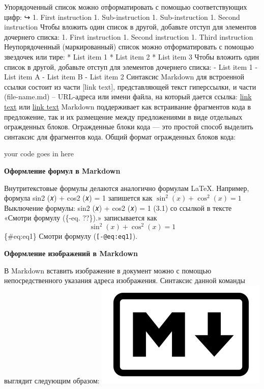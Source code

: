 \documentclass[
  english,
  russian,
  12pt,
  a4paper,
  DIV=11,
  numbers=noendperiod]{scrreprt}
\newenvironment{Shaded}{\begin{snugshade}}{\end{snugshade}}
\newcommand{\NormalTok}[1]{\textcolor[rgb]{0.00,0.23,0.31}{#1}}
\begin{document}
Упорядоченный список можно отформатировать с помощью соответствующих
цифр: ↪ 1. First instruction 1. Sub-instruction 1. Sub-instruction 1.
Second instruction Чтобы вложить один список в другой, добавьте отступ
для элементов дочернего списка: 1. First instruction 1. Second
instruction 1. Third instruction Неупорядоченный (маркированный) список
можно отформатировать с помощью звездочек или тире: * List item 1 * List
item 2 * List item 3 Чтобы вложить один список в другой, добавьте отступ
для элементов дочернего списка: - List item 1 - List item A - List item
B - List item 2 Синтаксис Markdown для встроенной ссылки состоит из
части {[}link text{]}, представляющей текст гиперссылки, и части
(file-name.md) -- URL-адреса или имени файла, на который дается ссылка:
\href{file-name.md}{link text} или \href{http://example.com/}{link text}
Markdown поддерживает как встраивание фрагментов кода в предложение, так
и их размещение между предложениями в виде отдельных огражденных блоков.
Огражденные блоки кода --- это простой способ выделить синтаксис для
фрагментов кода. Общий формат огражденных блоков кода:

\begin{Shaded}
\begin{Highlighting}[]
\NormalTok{your code goes in here}
\end{Highlighting}
\end{Shaded}

\textbf{Оформление формул в Markdown}

Внутритекстовые формулы делаются аналогично формулам LaTeX. Например,
формула sin2 (𝑥) + cos2 (𝑥) = 1 запишется как
\(\sin^2 (x) + \cos^2 (x) = 1\) Выключение формулы: sin2 (𝑥) + cos2 (𝑥)
= 1 (3.1) со ссылкой в тексте «Смотри формулу (\{-eq. ??\}).»
записывается как \[
\sin^2 (x) + \cos^2 (x) = 1
\] \{\#eq:eq1\} Смотри формулу (\texttt{{[}-@eq:eq1{]}}).

\textbf{Оформление изображений в Markdown}

В Markdown вставить изображение в документ можно с помощью
непосредственного указания адреса изображения. Синтаксис данной команды
выглядит следующим образом:
\includegraphics[width=0.5\linewidth,height=\textheight,keepaspectratio]{image/imgtest.png}
\end{document}
